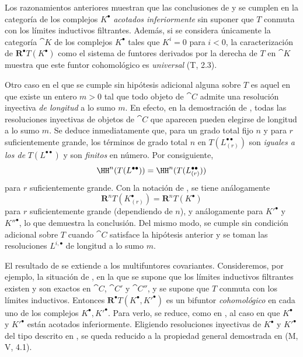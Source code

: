 \documentclass[oneside]{amsart}
\newcommand{\oldpage}[2][]{{\marginnote{\normalfont\textbf{#1}~|~#2}}\ignorespaces}
\let\EGAOriginalLabel\label
\renewcommand{\label}[1]{\phantomsection\EGAOriginalLabel{#1}}
\begin{document}
\begin{remark}[11.5.4]
\label{0.11.5.4}
Los razonamientos anteriores muestran que las conclusiones de  y  se cumplen en la categoría de los complejos $K^\bullet$ \emph{acotados inferiormente} sin suponer que $T$ conmuta con los límites inductivos filtrantes.
Además, si se considera únicamente la categoría $\cat{K}$ de los complejos $K^\bullet$ tales que $K^i=0$ para $i<0$, la caracterización de $\mathbf{R}^\bullet T(K^\bullet)$ como el sistema de funtores derivados por la derecha de $T$ en $\cat{K}$ muestra que este funtor cohomológico es \emph{universal} (T, 2.3).

Otro caso en el que  se cumple sin hipótesis adicional alguna sobre $T$ es aquel en que existe un entero $m>0$ tal que todo objeto de $\cat{C}$ admite una resolución inyectiva \emph{de longitud} a lo sumo $m$.
En efecto, en la demostración de , todas las resoluciones inyectivas de objetos de $\cat{C}$ que aparecen pueden elegirse de longitud a lo sumo $m$.
Se deduce inmediatamente que, para un grado total fijo $n$ y para $r$ suficientemente grande, los términos de grado total $n$ en $T(L^{\bullet\bullet}_{(r)})$ son \emph{iguales a los de} $T(L^{\bullet\bullet})$ y son \emph{finitos} en número.
Por consiguiente,
\[
  \HH^n(T(L^{\bullet\bullet}))
  =\HH^n(T(L^{\bullet\bullet}_{(r)}))
\]
para $r$ suficientemente grande.
Con la notación de , se tiene análogamente
\[
  \mathbf{R}^nT(K^\bullet_{(r)})=\mathbf{R}^nT(K^\bullet)
\]
para $r$ suficientemente grande (dependiendo de $n$), y análogamente para $K'^\bullet$ y $K''^\bullet$, lo que demuestra la conclusión.
Del mismo modo,  se cumple sin condición adicional sobre $T$ cuando $\cat{C}$ satisface la hipótesis anterior y se toman las resoluciones $L^{i,\bullet}$ de longitud a lo sumo $m$.
\end{remark}

\begin{env}[11.5.5]
\label{0.11.5.5}
El resultado de  se extiende a los multifuntores covariantes.
Consideremos, por ejemplo, la situación de , en la que se supone que los límites inductivos filtrantes existen y son exactos en $\cat{C}$, $\cat{C}'$ y $\cat{C}''$,
\oldpage[0\textsubscript{III}]{39}
y se supone que $T$ conmuta con los límites inductivos.
Entonces $\mathbf{R}^\bullet T(K^\bullet,K'^\bullet)$ es un bifuntor \emph{cohomológico} en cada uno de los complejos $K^\bullet,K'^\bullet$.
Para verlo, se reduce, como en , al caso en que $K^\bullet$ y $K'^\bullet$ están acotados inferiormente.
Eligiendo resoluciones inyectivas de $K^\bullet$ y $K'^\bullet$ del tipo descrito en , se queda reducido a la propiedad general demostrada en (M, V, 4.1).
\end{env}
\end{document}
